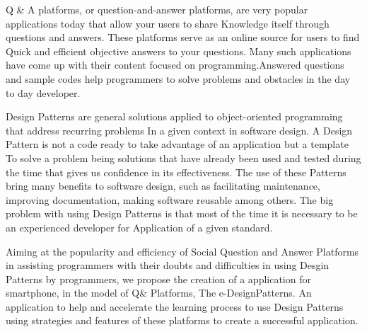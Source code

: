Q & A platforms, or question-and-answer platforms, are very popular applications today that allow your users to share
 Knowledge itself through questions and answers. These platforms serve as an online source for users to find
 Quick and efficient objective answers to your questions. Many such applications have come up with their content focused
 on programming.Answered questions and sample codes help programmers to solve problems and obstacles in the day to day developer.

Design Patterns are general solutions applied to object-oriented programming that address recurring problems
 In a given context in software design. A Design Pattern is not a code ready to take advantage of an application but a template
 To solve a problem being solutions that have already been used and tested during the time that gives us confidence in its effectiveness.
 The use of these Patterns bring many benefits to software design, such as facilitating maintenance, improving documentation, making
 software reusable among others. The big problem with using Design Patterns is that most of the time it is necessary to be an experienced developer for Application of a given standard.

Aiming at the popularity and efficiency of Social Question and Answer Platforms in assisting programmers with their doubts and difficulties in using
 Desgin Patterns by programmers, we propose the creation of a application for smartphone, in the model of Q\&  Platforms, 
The e-DesignPatterns. An application to help and accelerate the learning process to use Design Patterns using strategies and features of these platforms to create a successful application.